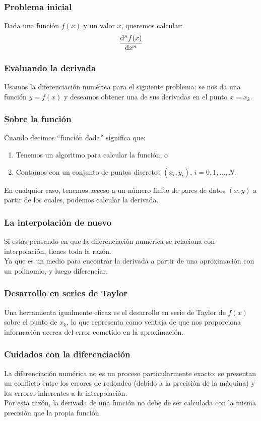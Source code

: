 \documentclass[12pt]{beamer}
\begin{document}
\begin{frame}
\frametitle{Problema inicial}
Dada una función $f (x)$ y un valor $x$, queremos calcular:
\pause
\begin{align*}
\dv[n]{f (x)}{x}
\end{align*}
\end{frame}
\begin{frame}
\frametitle{Evaluando la derivada}
Usamos la diferenciación numérica para el siguiente problema: \pause se nos da una función $y = f (x)$ y deseamos obtener una de sus derivadas en el punto $x = x_{k}$.
\end{frame}
\begin{frame}
\frametitle{Sobre la función}
Cuando decimos \enquote{función dada} significa que:
\begin{enumerate}[<+->]
\item Tenemos un algoritmo para calcular la función, o
\item Contamos con un conjunto de puntos discretos $(x_{i}, y_{i})$, $i = 0, 1,\ldots,N$.
\end{enumerate}
\pause
En cualquier caso, tenemos acceso a un número finito de pares de datos $(x, y)$ a partir de los cuales, podemos calcular la derivada.
\end{frame}
\begin{frame}
\frametitle{La interpolación de nuevo}
Si estás pensando en que la diferenciación numérica se relaciona con interpolación, tienes toda la razón.
\\
\bigskip
\pause
Ya que es un medio para encontrar la derivada a partir de una aproximación con un polinomio, y luego diferenciar.
\end{frame}
\begin{frame}
\frametitle{Desarrollo en series de Taylor}
Una herramienta igualmente eficaz es el desarrollo en serie de Taylor de $f (x)$ sobre el punto de $x_{k}$, lo que representa como ventaja de que nos proporciona información acerca del error cometido en la aproximación.
\end{frame}
\begin{frame}
\frametitle{Cuidados con la diferenciación}
La diferenciación numérica no es un proceso particularmente exacto: \pause se presentan un conflicto entre \textcolor{ao}{los errores de redondeo} (debido a la precisión de la máquina) y \textcolor{beaver}{los errores inherentes a la interpolación}.
\\
\bigskip
\pause
Por esta razón, la derivada de una función no debe de ser calculada con la misma precisión que la propia función.
\end{frame}
\end{document}
